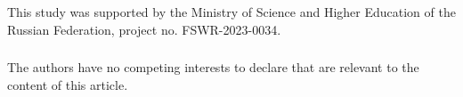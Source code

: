\documentclass[runningheads]{llncs}
\begin{document}
\begin{credits}
\subsubsection{\ackname} This study was supported by the Ministry of Science and Higher Education of the Russian Federation, project no. FSWR-2023-0034.

\subsubsection{\discintname}
The authors have no competing interests to declare that are relevant to the content of this article.
\end{credits}
%
%
%


%
%
%
%
%
\end{document}
